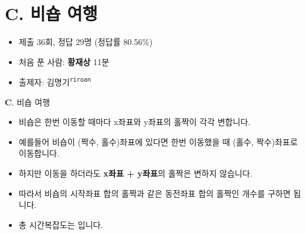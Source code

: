 \section{C. 비숍 여행}

\begin{frame} %
    \begin{itemize}
    	\item 제출 36회, 정답 29명 (정답률 80.56\%)
    	\item 처음 푼 사람: \textbf{황재상} 11분
        \item 출제자: 김명기\textsuperscript{\color{kupc-gray}\texttt{riroan}}
    \end{itemize}
\end{frame}

\begin{frame}{\textbf{C}. 비숍 여행}
    \begin{itemize}
    	\item 비숍은 한번 이동할 때마다 x좌표와 y좌표의 홀짝이 각각 변합니다.
    	\item 예를들어 비숍이 (짝수, 홀수)좌표에 있다면 한번 이동했을 때 (홀수, 짝수)좌표로 이동합니다.
    	\item 하지만 이동을 하더라도 \textbf{x좌표 + y좌표}의 홀짝은 변하지 않습니다.
    	\item 따라서 비숍의 시작좌표 합의 홀짝과 같은 동전좌표 합의 홀짝인 개수를 구하면 됩니다.
    	\item 총 시간복잡도는 입니다.
    \end{itemize}
\end{frame}